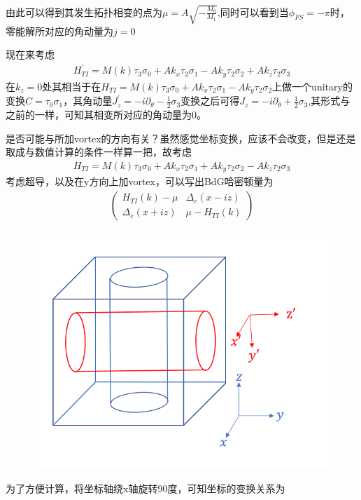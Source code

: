 \documentclass[22pt]{article}
\begin{document}
由此可以得到其发生拓扑相变的点为$\mu=A\sqrt{-\frac{M_0}{M_1}}$,同时可以看到当$\phi_{FS}=-\pi$时，零能解所对应的角动量为$j=0$
\par 
现在来考虑
\begin{align}
	H_{TI}^{'}=M(k)\tau_3\sigma_0+Ak_x\tau_2\sigma_1-Ak_y\tau_2\sigma_2+Ak_z\tau_2\sigma_3
\end{align}
在$k_z=0$处其相当于在$H_{TI}=M(k)\tau_3\sigma_0+Ak_x\tau_2\sigma_1-Ak_y\tau_2\sigma_2$上做一个unitary的变换$C=\tau_0\sigma_1$，其角动量$J_z^{'}=-i\partial_{\theta}-\frac{1}{2}\sigma_3$变换之后可得$J_z=-i\partial_{\theta}+\frac{1}{2}\sigma_3$,其形式与之前的一样，可知其相变所对应的角动量为0。
\par 
是否可能与所加vortex的方向有关？虽然感觉坐标变换，应该不会改变，但是还是取成与数值计算的条件一样算一把，故考虑
\begin{align}
	H_{TI}=M(k)\tau_3\sigma_0+Ak_x\tau_2\sigma_1+Ak_y\tau_2\sigma_2-Ak_z\tau_2\sigma_3
\end{align}
考虑超导，以及在y方向上加vortex，可以写出BdG哈密顿量为
\begin{align}
	\begin{pmatrix}
	H_{TI}(k)-\mu  &  \Delta_e(x-iz) \\
	\Delta_e(x+iz)  &    \mu-H_{TI}(k)
	\end{pmatrix}
\end{align}
\begin{figure}[H]
	\centering
	\includegraphics[scale=0.5]{Picture/2}
\end{figure}
为了方便计算，将坐标轴绕x轴旋转90度，可知坐标的变换关系为
\end{document}
